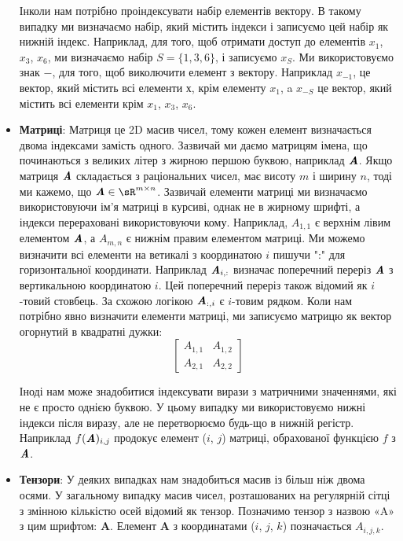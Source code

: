 \begin{itemize}
Інколи нам потрібно проіндексувати набір елементів вектору. В такому випадку ми визначаємо набір, який містить індекси і записуємо цей набір як нижній індекс. Наприклад, для того, щоб отримати доступ до елементів $x_1$, $x_3$, $x_6$, ми визначаємо набір $S = \{1, 3, 6\}$, і записуємо $x_S$. Ми використовуємо знак $-$, для того, щоб виколючити елемент з вектору. Наприклад $x_{-1}$, це вектор, який містить всі елементи $х$, крім елементу $x_1$, a $x_{-S}$ це вектор, який містить всі елементи крім $x_1$, $x_3$, $x_6$.
\item \textbf{Матриці}: Матриця це 2D масив чисел, тому кожен елемент визначається двома індексами замість одного. Зазвичай ми даємо матрицям імена, що починаються з великих літер з жирною першою буквою, наприклад $\textbf{\textit{A}}$. Якщо матриця $\textbf{\textit{A}}$ складається з раціональних чисел, має висоту $m$ і ширину $n$, тоді ми кажемо, що $\textbf{\textit{A}} \in \displaystyle \sR^{m \times n}$. Зазвичай елементи матриці ми визначаємо використовуючи ім'я матриці в курсиві, однак не в жирному шрифті, а індекси перераховані використовуючи кому. Наприклад, $A_{1,1}$ є верхнім лівим елементом $\textbf{\textit{A}}$, а $A_{m,n}$ є нижнім правим елементом матриці. Ми можемо визначити всі елементи на ветикалі з координатою $i$ пишучи ":" для горизонтальної координати. Наприклад $\textbf{\textit{A}}_{i,:}$ визначає поперечний переріз $\textbf{\textit{A}}$ з вертикальною координатою $i$. Цей поперечний переріз також відомий як $i$-товий стовбець. За схожою логікою $\textbf{\textit{A}}_{:,i}$ є $i$-товим рядком. Коли нам потрібно явно визначити елементи матриці, ми записуємо матрицю як вектор огорнутий в квадратні дужки:
\begin{equation}
\begin{bmatrix}
A_{1,1} & A_{1,2}\\
A_{2,1} & A_{2,2}
\end{bmatrix}
\end{equation}

Іноді нам може знадобитися індексувати вирази з матричними значеннями, які не є просто
однією буквою. У цьому випадку ми використовуємо нижні індекси після виразу, але не перетворюємо будь-що в нижній регістр. Наприклад $f(\textbf{\textit{A}})_{i,j}$ продокує елемент ($i$, $j$) матриці, обрахованої функцією $f$ з $\textbf{\textit{A}}$.

\item \textbf{Тензори}: У деяких випадках нам знадобиться масив із більш ніж двома осями.
У загальному випадку масив чисел, розташованих на регулярній сітці з змінною кількістю осей відомий як тензор. Позначимо тензор з назвою «A»
з цим шрифтом: \textbf{A}. Елемент \textbf{A} з координатами ($i$, $j$, $k$) позначається $A_{i,j,k}$.
\end{itemize}

